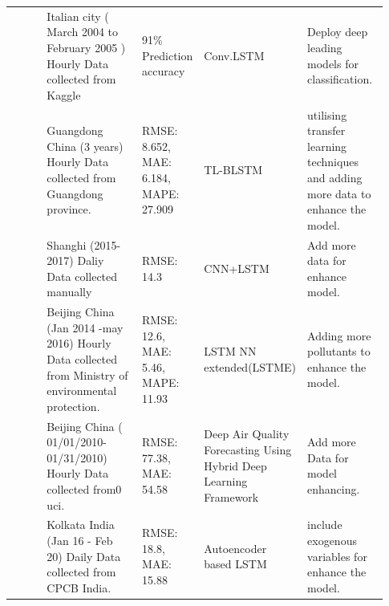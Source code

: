 \documentclass[a4paper, fleqn]{cas-sc}
\theoremstyle{definition}
\theoremstyle{remark}
\begin{document}
\begin{landscape}
{\begin{longtable}[h!]{ p{0.12\linewidth} p{0.27\linewidth} p{0.16\linewidth} p{0.16\linewidth} p{0.22\linewidth} }
\cite{zhu2023deep}           & Italian city ( March 2004 to   February 2005 ) Hourly Data collected from Kaggle & 91\% Prediction accuracy & Conv.LSTM                                                           & Deploy deep leading models for classification.  \\
 \cite{ma2019improving}               & Guangdong China (3 years) Hourly   Data collected from Guangdong province.                               & RMSE: 8.652,  MAE: 6.184,    MAPE: 27.909                                                                   & TL-BLSTM                                                            & utilising transfer learning techniques and adding more data to enhance the model.     \\
\cite{qin2019novel}       & Shanghi (2015-2017) Daliy Data collected   manually  & RMSE:  14.3   & CNN+LSTM     &  Add more data for enhance model. \\
 \cite{li2017long}          & Beijing China (Jan 2014 -may   2016) Hourly Data collected from Ministry of environmental protection.    & RMSE: 12.6,  MAE: 5.46,  MAPE:  11.93                                                                        & LSTM NN extended(LSTME)                                             & Adding more pollutants to enhance the model.                                           \\
 \cite{du2019deep}         & Beijing China (   01/01/2010-01/31/2010) Hourly Data collected from0 uci.                                 & RMSE: 77.38,  MAE: 54.58                                                                                   & Deep Air Quality Forecasting   Using Hybrid Deep Learning Framework & Add more Data for model enhancing.\\
\cite{nath2021long}       & Kolkata India (Jan 16 - Feb 20)  Daily Data collected from CPCB   India.                               & RMSE: 18.8,  MAE: 15.88                                                                                    & Autoencoder based LSTM                                             &  include exogenous variables for enhance the model. \\ \hline
  \end{longtable}}
  \end{landscape}

  
\end{document}
